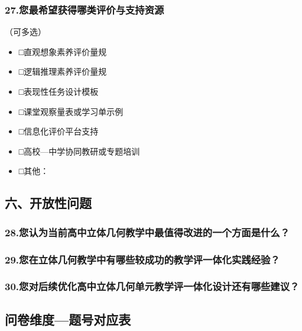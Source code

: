 \documentclass[UTF8,a4paper,12pt,twoside]{ctexart}
\begin{document}
\subsubsection*{27.您最希望获得哪类评价与支持资源}
（可多选）
\begin{itemize}
\item □直观想象素养评价量规
\item □逻辑推理素养评价量规
\item □表现性任务设计模板
\item □课堂观察量表或学习单示例
\item □信息化评价平台支持
\item □高校—中学协同教研或专题培训
\item □其他：\underline{\hspace{2cm}}
\end{itemize}

\subsection*{六、开放性问题}

\subsubsection*{28.您认为当前高中立体几何教学中最值得改进的一个方面是什么？}

\subsubsection*{29.您在立体几何教学中有哪些较成功的教学评一体化实践经验？}

\subsubsection*{30.您对后续优化高中立体几何单元教学评一体化设计还有哪些建议？}

\subsection*{问卷维度—题号对应表}
\end{document}

